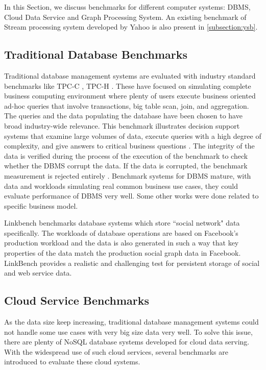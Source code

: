 In this Section, we discuss benchmarks for different computer systems: DBMS, Cloud Data Service and Graph Processing System. An existing benchmark of Stream processing system developed by Yahoo is also present in \cref{subsection:ysb}. 

\subsection{Traditional Database Benchmarks}
Traditional database management systems are evaluated with industry standard benchmarks like TPC-C \cite{TPC-C}, TPC-H \cite{TPC-H}. These have focused on simulating complete business computing environment where plenty of users execute business oriented ad-hoc queries that involve transactions, big table scan, join, and aggregation. The queries and the data populating the database have been chosen to have broad industry-wide relevance. This benchmark illustrates decision support systems that examine large volumes of data, execute queries with a high degree of complexity, and give answers to critical business questions \cite{TPC-H}. The integrity of the data is verified during the process of the execution of the benchmark to check whether the DBMS corrupt the data. If the data is corrupted, the benchmark measurement is rejected entirely \cite{dey2014ycsb+t}. Benchmark systems for DBMS mature, with data and workloads simulating real common business use cases, they could evaluate performance of DBMS very well. Some other works were done related to specific business model. 

Linkbench \cite{LinkBench} benchmarks database systems which store ``social network" data specifically. The workloads of database operations are based on Facebook's production workload and the data is also generated in such a way that key properties of the data match the production social graph data in Facebook. LinkBench provides a realistic and challenging test for persistent storage of social and web service data. 

\subsection{Cloud Service Benchmarks}
As the data size keep increasing, traditional database management systems could not handle some use cases with very big size data very well. To solve this issue, there are plenty of NoSQL database systems developed for cloud data serving. With the widespread use of such cloud services, several benchmarks are introduced to evaluate these cloud systems.

